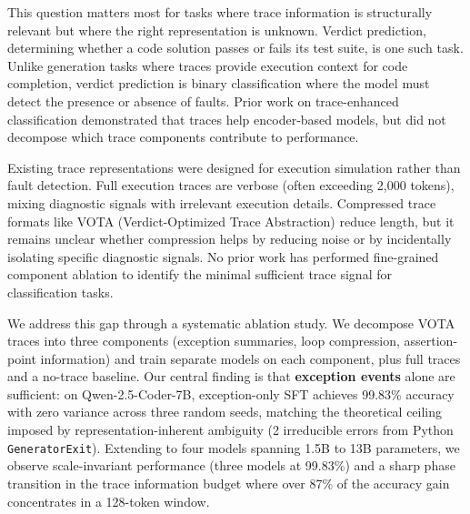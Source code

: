 \documentclass[11pt]{article}
\begin{document}
This question matters most for tasks where trace information is structurally relevant but where the right representation is unknown. Verdict prediction, determining whether a code solution passes or fails its test suite, is one such task. Unlike generation tasks where traces provide execution context for code completion, verdict prediction is binary classification where the model must detect the presence or absence of faults. Prior work on trace-enhanced classification \citep{traced2024} demonstrated that traces help encoder-based models, but did not decompose which trace components contribute to performance.

Existing trace representations were designed for execution simulation rather than fault detection. Full execution traces are verbose (often exceeding 2,000 tokens), mixing diagnostic signals with irrelevant execution details. Compressed trace formats like VOTA (Verdict-Optimized Trace Abstraction) reduce length, but it remains unclear whether compression helps by reducing noise or by incidentally isolating specific diagnostic signals. No prior work has performed fine-grained component ablation to identify the minimal sufficient trace signal for classification tasks.

We address this gap through a systematic ablation study. We decompose VOTA traces into three components (exception summaries, loop compression, assertion-point information) and train separate models on each component, plus full traces and a no-trace baseline. Our central finding is that \textbf{exception events} alone are sufficient: on Qwen-2.5-Coder-7B, exception-only SFT achieves 99.83\% accuracy with zero variance across three random seeds, matching the theoretical ceiling imposed by representation-inherent ambiguity (2 irreducible errors from Python \texttt{GeneratorExit}). Extending to four models spanning 1.5B to 13B parameters, we observe scale-invariant performance (three models at 99.83\%) and a sharp phase transition in the trace information budget where over 87\% of the accuracy gain concentrates in a 128-token window.
\end{document}
